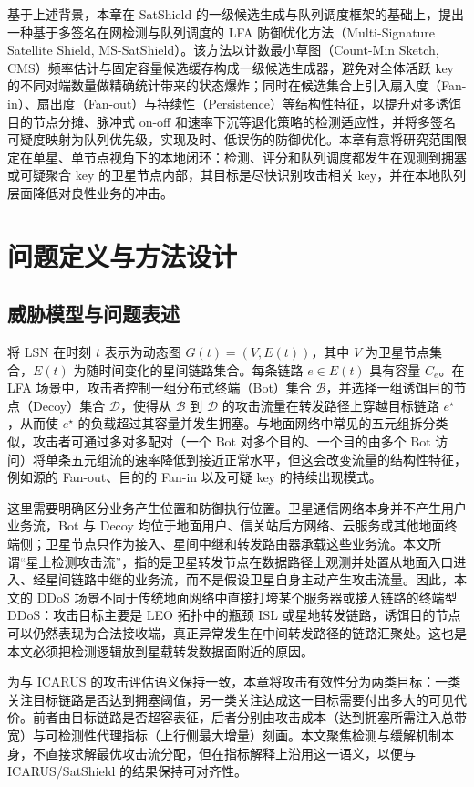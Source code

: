 基于上述背景，本章在 SatShield 的一级候选生成与队列调度框架的基础上，提出一种基于多签名在网检测与队列调度的 LFA 防御优化方法（Multi-Signature Satellite Shield, MS-SatShield）。该方法以计数最小草图（Count-Min Sketch, CMS）频率估计与固定容量候选缓存构成一级候选生成器，避免对全体活跃 key 的不同对端数量做精确统计带来的状态爆炸；同时在候选集合上引入扇入度（Fan-in）、扇出度（Fan-out）与持续性（Persistence）等结构性特征，以提升对多诱饵目的节点分摊、脉冲式 on-off 和速率下沉等退化策略的检测适应性，并将多签名可疑度映射为队列优先级，实现及时、低误伤的防御优化。本章有意将研究范围限定在单星、单节点视角下的本地闭环：检测、评分和队列调度都发生在观测到拥塞或可疑聚合 key 的卫星节点内部，其目标是尽快识别攻击相关 key，并在本地队列层面降低对良性业务的冲击。

\section{问题定义与方法设计}
\subsection{威胁模型与问题表述}
将 LSN 在时刻 $t$ 表示为动态图 $G(t)=(V,E(t))$，其中 $V$ 为卫星节点集合，$E(t)$ 为随时间变化的星间链路集合。每条链路 $e\in E(t)$ 具有容量 $C_e$。在 LFA 场景中，攻击者控制一组分布式终端（Bot）集合 $\mathcal{B}$，并选择一组诱饵目的节点（Decoy）集合 $\mathcal{D}$，使得从 $\mathcal{B}$ 到 $\mathcal{D}$ 的攻击流量在转发路径上穿越目标链路 $e^\star$，从而使 $e^\star$ 的负载超过其容量并发生拥塞。与地面网络中常见的五元组拆分类似，攻击者可通过多对多配对（一个 Bot 对多个目的、一个目的由多个 Bot 访问）将单条五元组流的速率降低到接近正常水平，但这会改变流量的结构性特征，例如源的 Fan-out、目的的 Fan-in 以及可疑 key 的持续出现模式。

这里需要明确区分业务产生位置和防御执行位置。卫星通信网络本身并不产生用户业务流，Bot 与 Decoy 均位于地面用户、信关站后方网络、云服务或其他地面终端侧；卫星节点只作为接入、星间中继和转发路由器承载这些业务流。本文所谓“星上检测攻击流”，指的是卫星转发节点在数据路径上观测并处置从地面入口进入、经星间链路中继的业务流，而不是假设卫星自身主动产生攻击流量。因此，本文的 DDoS 场景不同于传统地面网络中直接打垮某个服务器或接入链路的终端型 DDoS：攻击目标主要是 LEO 拓扑中的瓶颈 ISL 或星地转发链路，诱饵目的节点可以仍然表现为合法接收端，真正异常发生在中间转发路径的链路汇聚处。这也是本文必须把检测逻辑放到星载转发数据面附近的原因。

为与 ICARUS 的攻击评估语义保持一致，本章将攻击有效性分为两类目标：一类关注目标链路是否达到拥塞阈值，另一类关注达成这一目标需要付出多大的可见代价。前者由目标链路是否超容表征，后者分别由攻击成本（达到拥塞所需注入总带宽）与可检测性代理指标（上行侧最大增量）刻画。本文聚焦检测与缓解机制本身，不直接求解最优攻击流分配，但在指标解释上沿用这一语义，以便与 ICARUS/SatShield 的结果保持可对齐性。

